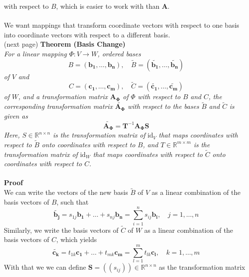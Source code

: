 \documentclass{report}
\begin{document}
with respect to $B$, which is easier to work with than $\bm{A}$.\\
\vspace{1mm}\\
We want mappings that transform coordinate vectors with respect to 
one basis into coordinate vectors with respect to a different basis.\\
(next page)
\newpage
\noindent\textbf{Theorem (Basis Change)}\\
\textit{For a linear mapping $\Phi:V\rightarrow W$, ordered bases}
\begin{equation*}
B=(\bm{b_1,\ldots,b_n}),\quad\tilde{B}=(\bm{\tilde{b_1}},\ldots,\bm{\tilde{b_n}})
\end{equation*}
\textit{of $V$ and}
\begin{equation*}
C=(\bm{c_1,\ldots,c_m}),\quad\tilde{C}=(\bm{\tilde{c_1}},\ldots,\bm{\tilde{c_m}})
\end{equation*}
\textit{of $W$, and a transformation matrix $\bm{A_\Phi}$ of $\Phi$ with respect to $B$ and $C$,
the corresponding transformation matrix $\tilde{\bm{A_\Phi}}$ with respect to the bases 
$\tilde{B}$ and $\tilde{C}$ is given as}
\begin{equation*}
\tilde{\bm{A_\Phi}}=\bm{T}^{-1}\bm{A_\Phi S}
\end{equation*}
\textit{Here, $S\in\mathbb{R}^{n\times n}$ is the transformation matrix of} $\text{id}_V$ 
\textit{that maps coordinates with respect to $\tilde{B}$ onto coordinates with respect to $B$,
and $T\in\mathbb{R}^{m\times m}$ is the transformation matrix of $\text{id}_W$ that maps coordinates 
with respect to $\tilde{C}$ onto coordinates with respect to $C$.}\\
\vspace{1mm}\\
\textbf{Proof}\\
We can write the vectors of the new basis $\tilde{B}$ of $V$ as a linear combination of the basis 
vectors of $B$, such that
\begin{equation*}
\tilde{\bm{b_j}}=s_{1j}\bm{b_1}+\ldots+s_{nj}\bm{b_n}
=\sum^n_{i=1}s_{ij}\bm{b_i},\quad j=1,\ldots,n
\end{equation*}
Similarly, we write the basis vectors of $\tilde{C}$ of $W$ as a linear combination of the basis vectors 
of $C$, which yields
\begin{equation*}
\tilde{\bm{c_k}}=t_{1k}\bm{c_1}+\ldots+t_{mk}\bm{c_m}
=\sum^m_{l=1}t_{lk}\bm{c_l},\quad k=1,\ldots,m
\end{equation*}
With that we we can define $\bm{S}=((s_{ij}))\in\mathbb{R}^{n\times n}$ as the transformation matrix 
\end{document}
